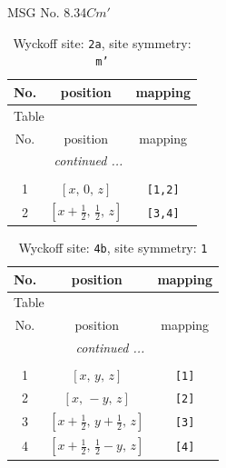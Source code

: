 \documentclass[fleqn,8pt]{jsarticle}
\begin{document}
\setcounter{MaxMatrixCols}{32}

\renewcommand{\tablename}{Table~}
\renewcommand{\figurename}{Figure~}
\begin{center}
\LARGE
MSG No. 8.34\quad$Cm'$
\end{center}
\renewcommand{\arraystretch}{1.2}
\begin{longtable}{ccc}
\caption{Wyckoff site: {\tt 2a}, site symmetry: {\tt m'}}
 \\
 \hline \hline
No. & position & mapping \\ \hline \endfirsthead

\multicolumn{2}{l}{\tablename\ \thetable{}} \\
 \hline \hline
No. & position & mapping \\ \hline \endhead

 \hline \hline
\multicolumn{2}{r}{\footnotesize\it continued ...} \\ \endfoot

 \hline \hline
\multicolumn{2}{r}{} \\ \endlastfoot

1 & $\left[ x,\, 0,\, z \right]$ & {\tt [1,2]} \\ \hline
2 & $\left[ x + \frac{1}{2},\, \frac{1}{2},\, z \right]$ & {\tt [3,4]} \\
\end{longtable}
\renewcommand{\arraystretch}{1.2}
\begin{longtable}{ccc}
\caption{Wyckoff site: {\tt 4b}, site symmetry: {\tt 1}}
 \\
 \hline \hline
No. & position & mapping \\ \hline \endfirsthead

\multicolumn{2}{l}{\tablename\ \thetable{}} \\
 \hline \hline
No. & position & mapping \\ \hline \endhead

 \hline \hline
\multicolumn{2}{r}{\footnotesize\it continued ...} \\ \endfoot

 \hline \hline
\multicolumn{2}{r}{} \\ \endlastfoot

1 & $\left[ x,\, y,\, z \right]$ & {\tt [1]} \\ \hline
2 & $\left[ x,\, - y,\, z \right]$ & {\tt [2]} \\ \hline
3 & $\left[ x + \frac{1}{2},\, y + \frac{1}{2},\, z \right]$ & {\tt [3]} \\ \hline
4 & $\left[ x + \frac{1}{2},\, \frac{1}{2} - y,\, z \right]$ & {\tt [4]} \\
\end{longtable}
\end{document}
